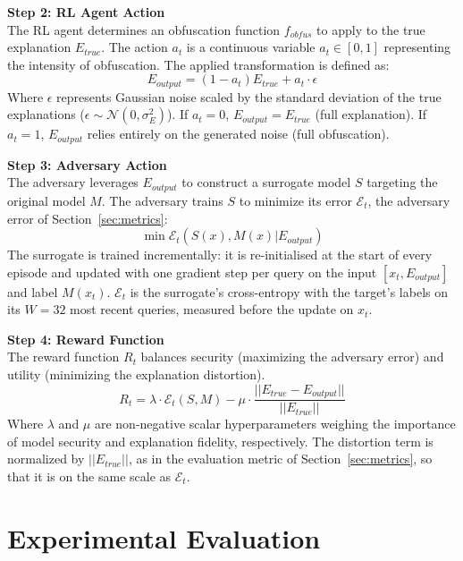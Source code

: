 \documentclass[conference]{IEEEtran}
\DeclareRobustCommand{\rev}[1]{#1}
\DeclareRobustCommand{\revnew}[1]{#1}
\begin{document}
\textbf{Step 2: RL Agent Action}\\
The RL agent determines an obfuscation function $f_{obfus}$ to apply to the true explanation $E_{true}$. The action $a_t$ is a continuous variable $a_t \in [0, 1]$ representing the intensity of obfuscation. The applied transformation is defined as:
\begin{equation}
E_{output} = (1 - a_t)E_{true} + a_t \cdot \epsilon
\end{equation}
Where $\epsilon$ represents Gaussian noise scaled by the standard deviation of the true explanations ($\epsilon \sim \mathcal{N}(0, \sigma_E^2)$). If $a_t = 0$, $E_{output} = E_{true}$ (full explanation). If $a_t = 1$, $E_{output}$ relies entirely on the generated noise (full obfuscation).

\textbf{Step 3: Adversary Action}\\
The adversary leverages $E_{output}$ to construct a surrogate model $S$ targeting the original model $M$. \revnew{The adversary trains $S$ to minimize its error $\revnew{\mathcal{E}_t}$, the adversary error of Section~\ref{sec:metrics}:}
\begin{equation}
\min \revnew{\mathcal{E}_t}(S(x), M(x) | E_{output})
\end{equation}
\rev{The surrogate is trained incrementally: it is re-initialised at the start of every episode and updated with one gradient step per query on the input $[x_t, E_{output}]$ and label $M(x_t)$. $\revnew{\mathcal{E}_t}$ is the surrogate's cross-entropy with the target's labels on its $W=32$ most recent queries, measured before the update on $x_t$.}

\textbf{Step 4: Reward Function}\\
The reward function $R_t$ balances security (maximizing \revnew{the adversary error}) and utility (minimizing \revnew{the explanation distortion}).
\begin{equation}
R_t = \lambda \cdot \revnew{\mathcal{E}_t}(S, M) - \mu \cdot \rev{\frac{||E_{true} - E_{output}||}{||E_{true}||}}
\end{equation}
Where $\lambda$ and $\mu$ are non-negative scalar hyperparameters weighing the importance of model security and explanation fidelity, respectively. \rev{The distortion term is normalized by $||E_{true}||$, as in the evaluation metric of Section~\ref{sec:metrics}, so that it is on the same scale as $\revnew{\mathcal{E}_t}$.}

\section{Experimental Evaluation}
\end{document}
